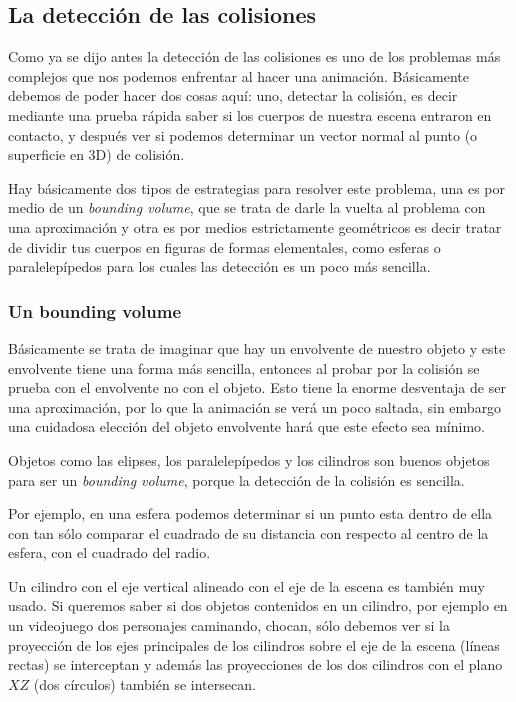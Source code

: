 \subsection{La detección de las colisiones}
Como ya se dijo antes la detección de las colisiones es uno de los problemas más complejos que nos podemos enfrentar al hacer una animación.
Básicamente debemos de poder hacer dos cosas aquí: uno, detectar la colisión, es decir mediante una prueba rápida saber si los cuerpos de nuestra escena entraron en contacto, y después ver si podemos determinar un vector normal al punto (o superficie en 3D) de colisión.

Hay básicamente dos tipos de estrategias para resolver este problema, una es por medio de un \emph{\textenglish{bounding volume}}, que se trata de darle la vuelta al problema con una aproximación y otra es por medios estrictamente geométricos es decir tratar de dividir tus cuerpos en figuras de formas elementales, como esferas o paralelepípedos para los cuales las detección es un poco más sencilla.

\subsubsection{Un bounding volume}
Básicamente se trata de imaginar que hay un envolvente de nuestro objeto y este envolvente tiene una forma más sencilla, entonces al probar por la colisión se prueba con el envolvente no con el objeto.
Esto tiene la enorme desventaja de ser una aproximación, por lo que la animación se verá un poco saltada, sin embargo una cuidadosa elección del objeto envolvente hará que este efecto sea mínimo.

Objetos como las elipses, los paralelepípedos y los cilindros son buenos objetos para ser un \emph{\textenglish{bounding volume}}, porque la detección de la colisión es sencilla.

Por ejemplo, en una esfera podemos determinar si un punto esta dentro de ella con tan sólo comparar el cuadrado de su distancia con respecto al centro de la esfera, con el cuadrado del radio. 

Un cilindro con el eje vertical alineado con el eje de la escena es también muy usado.
Si queremos saber si dos objetos contenidos en un cilindro, por ejemplo en un videojuego dos personajes caminando, chocan, sólo debemos ver si la proyección de los ejes principales de los cilindros sobre el eje de la escena (líneas rectas) se interceptan y además las proyecciones de los dos cilindros con el plano $XZ$ (dos círculos) también se intersecan.


